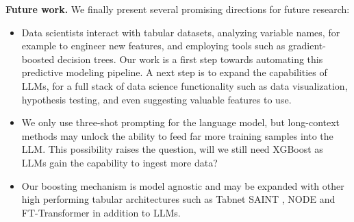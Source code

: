 \textbf{Future work.}  We finally present several promising directions for future research:
\begin{itemize}
\item Data scientists interact with tabular datasets, analyzing variable names, for example to engineer new features, and employing tools such as gradient-boosted decision trees.  Our work is a first step towards automating this predictive modeling pipeline.  A next step is to expand the capabilities of LLMs, for a full stack of data science functionality such as data visualization, hypothesis testing, and even suggesting valuable features to use.
\item We only use three-shot prompting for the language model, but long-context methods may unlock the ability to feed far more training samples into the LLM.  This possibility raises the question, will we still need XGBoost as LLMs gain the capability to ingest more data?
\item Our boosting mechanism is model agnostic and may be expanded with other high performing tabular architectures such as Tabnet \citep{tabnet} SAINT \citep{somepalli2021saint}, NODE \citep{Popov2019NeuralOD} and FT-Transformer \citep{gorishniy2021revisiting} in addition to LLMs.
\end{itemize} 
